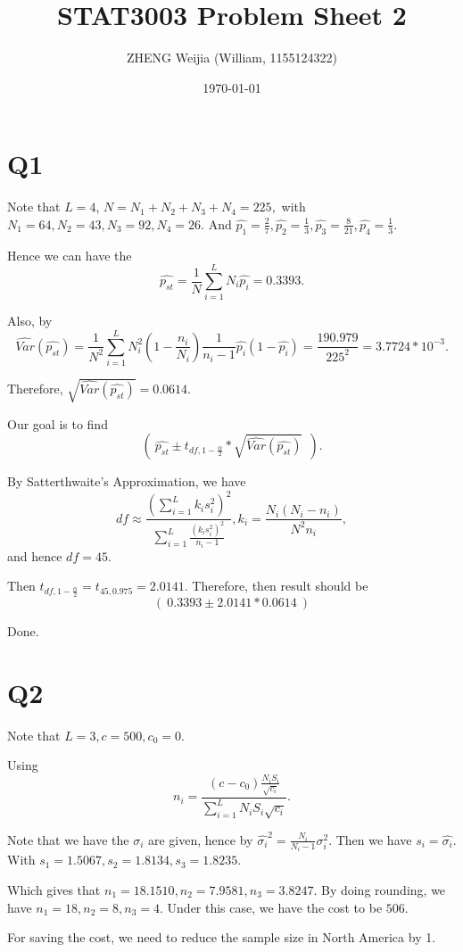 \documentclass[12pt]{article}%
\begin{document}
\title{STAT3003 Problem Sheet 2}
\author{ZHENG Weijia (William, 1155124322)}
\date{\today}
\maketitle



\section{Q1}

Note that $L=4$, $N=N_1+N_2+N_3+N_4 = 225,$ with $N_1=64, N_2=43, N_3 = 92, N_4=26.$ And $\hat{p_1}=\frac{2}{7}, \hat{p_2}=\frac{1}{3}, \hat{p_3}=\frac{8}{21}, \hat{p_4}=\frac{1}{3}.$

Hence we can have the $$\hat{p_{st}}=\frac{1}{N}\sum_{i=1}^{L}N_i \hat{p_i}=0.3393.$$

Also, by $$\hat{Var}(\hat{p_{st}})=\frac{1}{N^2}\sum_{i=1}^{L}N_i^2(1-\frac{n_i}{N_i})\frac{1}{n_i-1}\hat{p_i}(1-\hat{p_i})=\frac{190.979}{225^2}=3.7724*10^{-3}.$$

Therefore, $\sqrt{\hat{Var}(\hat{p_{st}})}=0.0614.$

Our goal is to find $$(~\hat{p_{st}} \pm t_{df,1-\frac{\alpha}{2}}*\sqrt{\hat{Var}(\hat{p_{st}})}~~).$$

By Satterthwaite's Approximation, we have $$df \approx \frac{(\sum_{i=1}^{L}k_i s_{i}^2)^2}{\sum_{i=1}^{L}\frac{(k_i s_i^2)^2}{n_i-1}}, k_i=\frac{N_i(N_i-n_i)}{N^2n_i},$$ and hence $df=45.$

Then $t_{df,1-\frac{\alpha}{2}}=t_{45,0.975}=2.0141.$ Therefore, then result should be $$(~0.3393\pm 2.0141*0.0614~)$$

Done.

\section{Q2}
Note that $L=3, c = 500, c_0 =0.$

Using $$n_i=\frac{(c-c_0)\frac{N_i S_i}{\sqrt{c_i}}}{\sum_{i=1}^{L}N_i S_i \sqrt{c_i}}.$$ 

Note that we have the $\sigma_i$ are given, hence by $\hat{\sigma_i}^2=\frac{N_i}{N_i-1}\sigma_i^2.$ Then we have $s_i = \hat{\sigma_i}.$ With $s_1=1.5067, s_2 = 1.8134, s_3=1.8235.$

Which gives that $n_1=18.1510, n_2=7.9581, n_3=3.8247.$ By doing rounding, we have $n_1=18, n_2=8, n_3=4.$ Under this case, we have the cost to be $506.$

For saving the cost, we need to reduce the sample size in North America by 1. 
\end{document}
